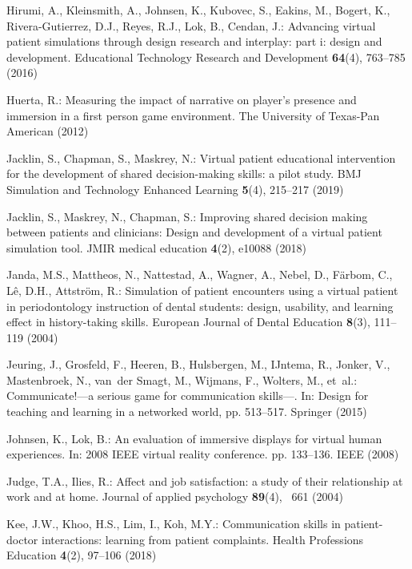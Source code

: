 \documentclass[runningheads]{llncs}
\begin{document}
\begin{thebibliography}{10}
Hirumi, A., Kleinsmith, A., Johnsen, K., Kubovec, S., Eakins, M., Bogert, K.,
  Rivera-Gutierrez, D.J., Reyes, R.J., Lok, B., Cendan, J.: Advancing virtual
  patient simulations through design research and interplay: part i: design and
  development. Educational Technology Research and Development  \textbf{64}(4),
   763--785 (2016)

Huerta, R.: Measuring the impact of narrative on player's presence and
  immersion in a first person game environment. The University of Texas-Pan
  American (2012)

Jacklin, S., Chapman, S., Maskrey, N.: Virtual patient educational intervention
  for the development of shared decision-making skills: a pilot study. BMJ
  Simulation and Technology Enhanced Learning  \textbf{5}(4),  215--217 (2019)

Jacklin, S., Maskrey, N., Chapman, S.: Improving shared decision making between
  patients and clinicians: Design and development of a virtual patient
  simulation tool. JMIR medical education  \textbf{4}(2),  e10088 (2018)

Janda, M.S., Mattheos, N., Nattestad, A., Wagner, A., Nebel, D., F{\"a}rbom,
  C., L{\^e}, D.H., Attstr{\"o}m, R.: Simulation of patient encounters using a
  virtual patient in periodontology instruction of dental students: design,
  usability, and learning effect in history-taking skills. European Journal of
  Dental Education  \textbf{8}(3),  111--119 (2004)

Jeuring, J., Grosfeld, F., Heeren, B., Hulsbergen, M., IJntema, R., Jonker, V.,
  Mastenbroek, N., van~der Smagt, M., Wijmans, F., Wolters, M., et~al.:
  Communicate!—a serious game for communication skills—. In: Design for
  teaching and learning in a networked world, pp. 513--517. Springer (2015)

Johnsen, K., Lok, B.: An evaluation of immersive displays for virtual human
  experiences. In: 2008 IEEE virtual reality conference. pp. 133--136. IEEE
  (2008)

Judge, T.A., Ilies, R.: Affect and job satisfaction: a study of their
  relationship at work and at home. Journal of applied psychology
  \textbf{89}(4), ~661 (2004)

Kee, J.W., Khoo, H.S., Lim, I., Koh, M.Y.: Communication skills in
  patient-doctor interactions: learning from patient complaints. Health
  Professions Education  \textbf{4}(2),  97--106 (2018)


\end{thebibliography}
\end{document}
